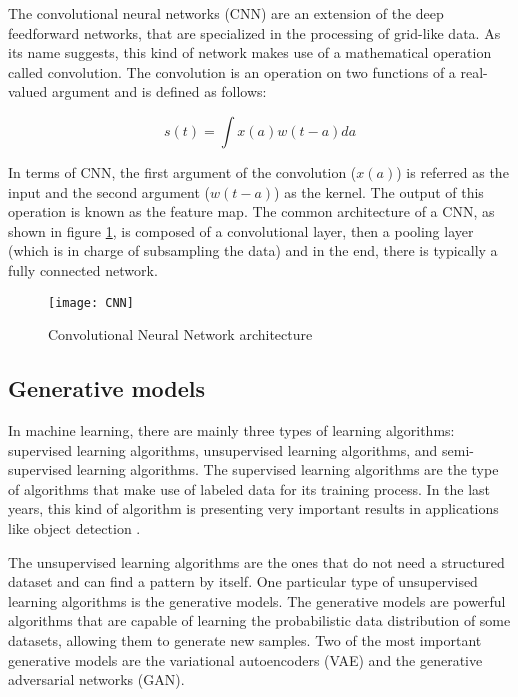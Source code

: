 The convolutional neural networks (CNN) \cite{Lecun1999} are an extension of the deep feedforward networks, that are specialized in the processing of grid-like data. As its name suggests, this kind of network makes use of a mathematical operation called convolution. The convolution is an operation on two functions of a real-valued argument and is defined as follows:

\begin{equation}
 s(t)=\int x(a) w(t-a) d a
\end{equation}

In terms of CNN, the first argument of the convolution (\begin{math} x(a) \end{math}) is referred as the input and the second argument (\begin{math} w(t - a) \end{math}) as the kernel. The output of this operation is known as the feature map. The common architecture of a CNN, as shown in figure \ref{fig:cnn}, is composed of a convolutional layer, then a pooling layer (which is in charge of subsampling the data) and in the end, there is typically a fully connected network.

\begin{figure}[htb]
  \centering
  \texttt{[image: CNN]}
  \caption[Convolutional Neural Network architecture]{Convolutional Neural Network architecture}
  \label{fig:cnn}
\end{figure}

\subsection{Generative models}

In machine learning, there are mainly three types of learning algorithms: supervised learning algorithms, unsupervised learning algorithms, and semi-supervised learning algorithms. The supervised learning algorithms are the type of algorithms that make use of labeled data for its training process. In the last years, this kind of algorithm is presenting very important results in applications like object detection \cite{Liu2019}.

The unsupervised learning algorithms are the ones that do not need a structured dataset and can find a pattern by itself. One particular type of unsupervised learning algorithms is the generative models. The generative models are powerful algorithms that are capable of learning the probabilistic data distribution of some datasets, allowing them to generate new samples. Two of the most important generative models are the variational autoencoders (VAE) and the generative adversarial networks (GAN).

